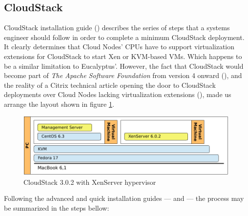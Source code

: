 \subsection{CloudStack}\label{subsec:cloudstack}

\noindent CloudStack installation guide (\cite{cloudstackquickinstall}) describes the series of steps that a systems engineer should follow in order to complete a minimum CloudStack deployment. It clearly determines that Cloud Nodes' CPUs have to support virtualization extensions for CloudStack to start Xen or KVM-based VMs. Which happens to be a similar limitation to Eucalyptus'. However, the fact that CloudStack would become part of \emph{The Apache Software Foundation} from version 4 onward (\cite{cloudstackstrategy}), and the reality of a Citrix technical article opening the door to CloudStack deployments over Cloud Nodes lacking virtualization extensions (\cite{apachecloudstack4}), made us arrange the layout shown in figure \ref{fig:cloudstack}.

\begin{figure}[tbp]
\begin{center}
\includegraphics[width=0.99\textwidth]{imagenes/008.pdf}
 \caption{CloudStack 3.0.2 with XenServer hypervisor}
\label{fig:cloudstack}
\end{center}
\end{figure}

Following the advanced and quick installation guides --- \cite{cloudstackquickinstall} and \cite{cloudstackadvinstall} --- the process may be summarized in the steps bellow:


